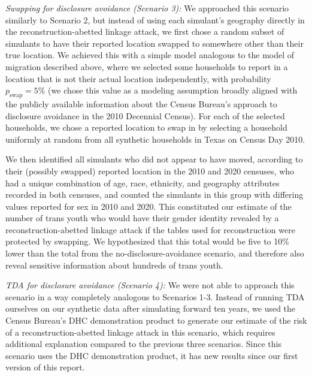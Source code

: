 \documentclass{jpc} %
\theoremstyle{plain}\newtheorem{satz}[thm]{Satz} %
\begin{document}
\emph{Swapping for disclosure avoidance (Scenario 3):} We approached this scenario similarly to Scenario 2, but instead of using each simulant's geography directly in the reconstruction-abetted linkage attack, we first chose a random subset of simulants to have their reported location swapped to somewhere other than their true location.  
We achieved this with a simple model analogous to the model of migration described above, where we selected some households to report in a location that is not their actual location independently, with probability $p_\text{swap} = 5\%$ (we chose this value as a modeling assumption broadly aligned with the  publicly available information about the Census Bureau's approach to disclosure avoidance in the 2010 Decennial Census).  For each of the selected households, we chose a reported location to swap in by selecting a household uniformly at random from all synthetic households in Texas on Census Day 2010.

We then identified all simulants who did not appear to have moved, according to their (possibly swapped) reported location in the 2010 and 2020 censuses, who had a unique combination of age, race, ethnicity, and geography attributes recorded in both censuses, and counted the simulants in this group with differing values reported for sex in 2010 and 2020.  This constituted our estimate of the number of trans youth who would have their gender identity revealed by a reconstruction-abetted linkage attack if the tables used for reconstruction were protected by swapping.  We hypothesized that this total would be five to 10\% lower than the total from the no-disclosure-avoidance scenario, and therefore also reveal sensitive information about hundreds of trans youth.

\emph{TDA for disclosure avoidance (Scenario 4):} We were not able to approach this scenario in a way completely analogous to Scenarios 1-3.  Instead of running TDA ourselves on our synthetic data after simulating forward ten years, we used the Census Bureau's DHC demonstration product to generate our estimate of the risk of a reconstruction-abetted linkage attack in this scenario, which requires additional explanation compared to the previous three scenarios.  Since this scenario uses the DHC demonstration product, it has new results since our first version of this report.
\end{document}
